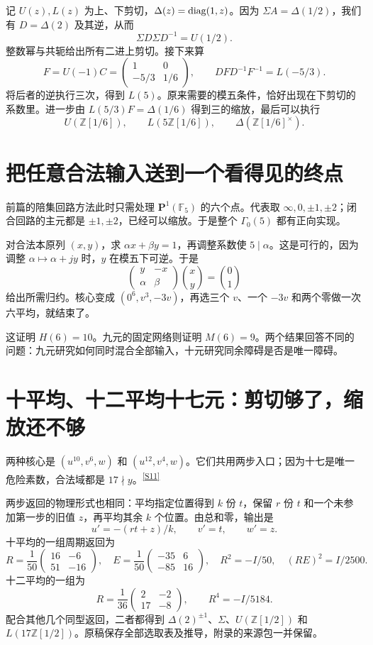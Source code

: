 \documentclass[11pt,a4paper,oneside,openany]{book}
\newcommand{\Z}{\mathbb Z}\newcommand{\Q}{\mathbb Q}\newcommand{\F}{\mathbb F}\newcommand{\CC}{\mathbb C}
\newcommand{\src}[1]{\textsuperscript{\hyperref[source:#1]{[#1]}}}
\theoremstyle{definition}\newtheorem{example}[theorem]{例}\newtheorem{conjecture}[theorem]{猜想}
\numberwithin{equation}{chapter}\setcounter{tocdepth}{1}
\begin{document}
记 $U(z),L(z)$ 为上、下剪切，$\Delta(z)=\operatorname{diag}(1,z)$。因为 $\Sigma A=\Delta(1/2)$，我们有 $D=\Delta(2)$ 及其逆，从而
\[\Sigma D\Sigma D^{-1}=U(1/2).
\]
整数幂与共轭给出所有二进上剪切。接下来算
\[
F=U(-1)C=\begin{pmatrix}1&0\\-5/3&1/6\end{pmatrix},\qquad
DFD^{-1}F^{-1}=L(-5/3).
\]
将后者的逆执行三次，得到 $L(5)$。原来需要的模五条件，恰好出现在下剪切的系数里。进一步由 $L(5/3)F=\Delta(1/6)$ 得到三的缩放，最后可以执行
\[U(\Z[1/6]),\qquad L(5\Z[1/6]),\qquad
\Delta(\Z[1/6]^\times).
\]

\section{把任意合法输入送到一个看得见的终点}
前篇的陪集回路方法此时只需处理 $\mathbf P^1(\F_5)$ 的六个点。代表取 $\infty,0,\pm1,\pm2$；闭合回路的主元都是 $\pm1,\pm2$，已经可以缩放。于是整个 $\Gamma_0(5)$ 都有正向实现。

对合法本原列 $(x,y)$，求 $\alpha x+\beta y=1$，再调整系数使 $5\mid\alpha$。这是可行的，因为调整 $\alpha\mapsto\alpha+jy$ 时，$y$ 在模五下可逆。于是
\[
\begin{pmatrix}y&-x\\\alpha&\beta\end{pmatrix}
\binom{x}{y}=\binom01
\]
给出所需归约。核心变成 $(0^6,v^3,-3v)$，再选三个 $v$、一个 $-3v$ 和两个零做一次六平均，就结束了。

这证明 $H(6)=10$。九元的固定网络则证明 $M(6)=9$。两个结果回答不同的问题：九元研究如何同时混合全部输入，十元研究同余障碍是否是唯一障碍。

\section{十平均、十二平均十七元：剪切够了，缩放还不够}
两种核心是 $(u^{10},v^6,w)$ 和 $(u^{12},v^4,w)$。它们共用两步入口；因为十七是唯一危险素数，合法域都是 $17\nmid y$。\src{S11}

两步返回的物理形式也相同：平均指定位置得到 $k$ 份 $t$，保留 $r$ 份 $t$ 和一个未参加第一步的旧值 $z$，再平均其余 $k$ 个位置。由总和零，输出是
\[u'=-(rt+z)/k,\qquad v'=t,\qquad w'=z.
\]
十平均的一组周期返回为
\[
R=\frac1{50}\begin{pmatrix}16&-6\\51&-16\end{pmatrix},
\quad E=\frac1{50}\begin{pmatrix}-35&6\\-85&16\end{pmatrix},
\quad R^2=-I/50,\quad(RE)^2=I/2500.
\]
十二平均的一组为
\[
R=\frac1{36}\begin{pmatrix}2&-2\\17&-8\end{pmatrix},
\qquad R^4=-I/5184.
\]
配合其他几个同型返回，二者都得到 $\Delta(2)^{\pm1}$、$\Sigma$、$U(\Z[1/2])$ 和 $L(17\Z[1/2])$。原稿保存全部选取表及推导，附录的来源包一并保留。
\end{document}
